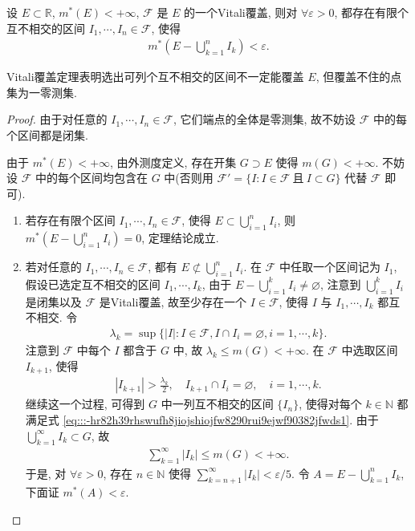 \documentclass[../../main.tex]{subfiles}%
\begin{document}
\begin{theorem}[Vitali覆盖定理]\label{theorem:Vitali覆盖定理--实变函数}
设 $E\subset\mathbb{R}$, $m^*(E)<+\infty$, $\mathcal{F}$ 是 $E$ 的一个Vitali覆盖, 则对 $\forall\varepsilon>0$, 都存在有限个互不相交的区间 $I_1,\cdots,I_n\in\mathcal{F}$, 使得
\begin{align*}
m^*\!\left(E-\bigcup_{k=1}^n I_k\right)<\varepsilon.
\end{align*}
\end{theorem}
\begin{remark}
Vitali覆盖定理表明选出可列个互不相交的区间不一定能覆盖 $E$, 但覆盖不住的点集为一零测集.
\end{remark}
\begin{proof}
由于对任意的 $I_1,\cdots,I_n\in\mathcal{F}$, 它们端点的全体是零测集, 故不妨设 $\mathcal{F}$ 中的每个区间都是闭集.

由于 $m^*(E)<+\infty$, 由外测度定义, 存在开集 $G\supset E$ 使得 $m(G)<+\infty$. 不妨设 $\mathcal{F}$ 中的每个区间均包含在 $G$ 中(否则用 $\mathcal{F}'=\{I:I\in\mathcal{F}\ \text{且}\ I\subset G\}$ 代替 $\mathcal{F}$ 即可).
\begin{enumerate}[(1)]
\item 若存在有限个区间 $I_1,\cdots,I_n\in\mathcal{F}$, 使得 $E\subset\bigcup_{i=1}^n I_i$, 则 $m^*\!\left(E-\bigcup_{i=1}^n I_i\right)=0$, 定理结论成立.
\item 若对任意的 $I_1,\cdots,I_n\in\mathcal{F}$, 都有 $E\not\subset\bigcup_{i=1}^n I_i$. 在 $\mathcal{F}$ 中任取一个区间记为 $I_1$, 假设已选定互不相交的区间 $I_1,\cdots,I_k$, 由于 $E-\bigcup_{i=1}^k I_i\neq\varnothing $, 注意到 $\bigcup_{i=1}^k I_i$ 是闭集以及 $\mathcal{F}$ 是Vitali覆盖, 故至少存在一个 $I\in\mathcal{F}$, 使得 $I$ 与 $I_1,\cdots,I_k$ 都互不相交. 令
\begin{align*}
\lambda_k=\sup\{|I|:I\in\mathcal{F}, I\cap I_i=\varnothing , i=1,\cdots,k\}.
\end{align*}
注意到 $\mathcal{F}$ 中每个 $I$ 都含于 $G$ 中, 故 $\lambda_k\leqslant m(G)<+\infty$. 在 $\mathcal{F}$ 中选取区间 $I_{k+1}$, 使得
\begin{align}
|I_{k+1}|>\frac{\lambda_k}{2},\quad I_{k+1}\cap I_i=\varnothing ,\quad i=1,\cdots,k.\label{eq:::-hr82h39rhswufh8jiojshiojfw8290rui9ejwf90382jfwds1}
\end{align}
继续这一个过程, 可得到 $G$ 中一列互不相交的区间 $\{I_n\}$, 使得对每个 $k\in\mathbb{N}$ 都满足式 \eqref{eq:::-hr82h39rhswufh8jiojshiojfw8290rui9ejwf90382jfwds1}. 由于 $\bigcup_{k=1}^\infty I_k\subset G$, 故
\begin{align}
\sum_{k=1}^\infty|I_k|\leqslant m(G)<+\infty.\label{eq:::-hr82h39rhswufh8jiojshiojfw8290rui9ejwf90382jfwds2}
\end{align}
于是, 对 $\forall\varepsilon>0$, 存在 $n\in\mathbb{N}$ 使得 $\sum_{k=n+1}^\infty|I_k|<\varepsilon/5$. 令 $A=E-\bigcup_{k=1}^n I_k$, 下面证 $m^*(A)<\varepsilon$.


\end{enumerate}
\end{proof}
\end{document}
